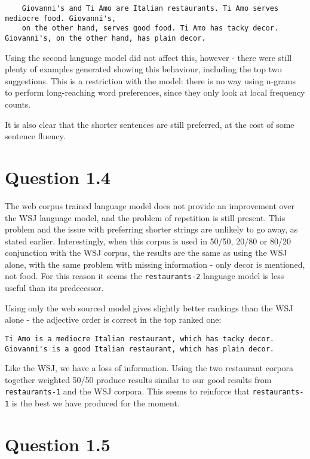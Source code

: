 \documentclass[a4paper,11pt,oneside]{article}
\begin{document}
\begin{verbatim}
    Giovanni's and Ti Amo are Italian restaurants. Ti Amo serves mediocre food. Giovanni's, 
    on the other hand, serves good food. Ti Amo has tacky decor. Giovanni's, on the other hand, has plain decor.
\end{verbatim}

Using the second language model did not affect this, however - there were still plenty of examples generated showing this behaviour, including the top two suggestions. This is a restriction with the model: there is no way using n-grams to perform long-reaching word preferences, since they only look at local frequency counts.

It is also clear that the shorter sentences are still preferred, at the cost of some sentence fluency.

\section{Question 1.4}
The web corpus trained language model does not provide an improvement over the WSJ language model, and the problem of repetition is still present. This problem and the issue with preferring shorter strings are unlikely to go away, as stated earlier. Interestingly, when this corpus is used in 50/50, 20/80 or 80/20 conjunction with the WSJ corpus, the results are the same as using the WSJ alone, with the same problem with missing information - only decor is mentioned, not food. For this reason it seems the \verb+restaurants-2+ language model is less useful than its predecessor.

Using only the web sourced model gives slightly better rankings than the WSJ alone - the adjective order is correct in the top ranked one:

\begin{verbatim}
Ti Amo is a mediocre Italian restaurant, which has tacky decor.
Giovanni's is a good Italian restaurant, which has plain decor.
\end{verbatim}

Like the WSJ, we have a loss of information. Using the two restaurant corpora together weighted 50/50 produce results similar to our good results from \verb+restaurants-1+ and the WSJ corpora. This seems to reinforce that \verb+restaurants-1+ is the best we have produced for the moment.

\section{Question 1.5}
\end{document}
